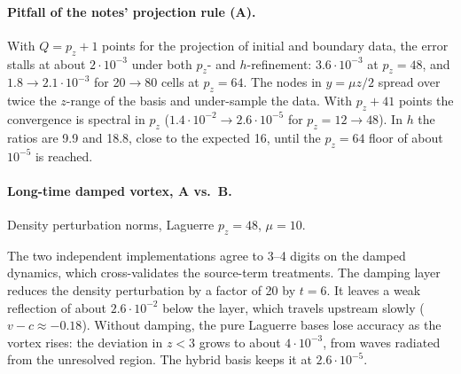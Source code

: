 \documentclass[11pt,a4paper]{article}
\begin{document}
\paragraph{Pitfall of the notes' projection rule (A).}
With $Q=p_z+1$ points for the projection of initial and boundary data, the error
stalls at about $2\cdot10^{-3}$ under both $p_z$- and $h$-refinement:
$3.6\cdot10^{-3}$ at $p_z=48$, and $1.8\to2.1\cdot10^{-3}$ for 20$\to$80 cells at
$p_z=64$. The nodes in $y=\mu z/2$ spread over twice the $z$-range of the basis and
under-sample the data. With $p_z+41$ points the convergence is spectral in $p_z$
($1.4\cdot10^{-2}\to2.6\cdot10^{-5}$ for $p_z=12\to48$). In $h$ the ratios are 9.9 and
18.8, close to the expected 16, until the $p_z=64$ floor of about $10^{-5}$ is
reached.

\paragraph{Long-time damped vortex, A vs.\ B.}
Density perturbation norms, Laguerre $p_z=48$, $\mu=10$.
\begin{center}
\end{center}
The two independent implementations agree to 3--4 digits on the damped dynamics,
which cross-validates the source-term treatments. The damping layer reduces the
density perturbation by a factor of 20 by $t=6$. It leaves a weak reflection of about
$2.6\cdot10^{-2}$ below the layer, which travels upstream slowly
($v-c\approx-0.18$). Without damping, the pure Laguerre bases lose accuracy as the
vortex rises: the deviation in $z<3$ grows to about $4\cdot10^{-3}$, from waves
radiated from the unresolved region. The hybrid basis keeps it at $2.6\cdot10^{-5}$.
\end{document}
